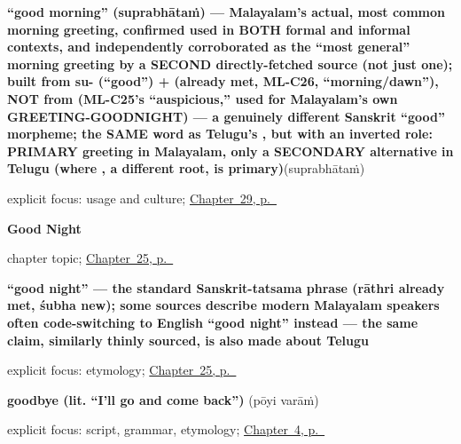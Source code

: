 \noindent\begin{minipage}[t]{\linewidth}
\raggedright
\textbf{\textquotedblleft{}good morning\textquotedblright{} (suprabhātaṁ) — Malayalam's actual, most common morning greeting, confirmed used in BOTH formal and informal contexts, and independently corroborated as the \textquotedblleft{}most general\textquotedblright{} morning greeting by a SECOND directly-fetched source (not just one); built from su- (\textquotedblleft{}good\textquotedblright{}) +  (already met, ML-C26, \textquotedblleft{}morning/dawn\textquotedblright{}), NOT from  (ML-C25's \textquotedblleft{}auspicious,\textquotedblright{} used for Malayalam's own GREETING-GOODNIGHT) — a genuinely different Sanskrit \textquotedblleft{}good\textquotedblright{} morpheme; the SAME word as Telugu's , but with an inverted role: PRIMARY greeting in Malayalam, only a SECONDARY alternative in Telugu (where , a different root, is primary)}\enspace\emph{}\enspace(suprabhātaṁ)\par
\footnotesize explicit focus: usage and culture; \hyperref[ch:ml-good-morning]{Chapter~29, p.~\pageref*{ch:ml-good-morning}}
\end{minipage}\par\smallskip

\noindent\begin{minipage}[t]{\linewidth}
\raggedright
\textbf{Good Night}\par
\footnotesize chapter topic; \hyperref[ch:ml-good-night]{Chapter~25, p.~\pageref*{ch:ml-good-night}}
\end{minipage}\par\smallskip

\noindent\begin{minipage}[t]{\linewidth}
\raggedright
\textbf{\textquotedblleft{}good night\textquotedblright{} — the standard Sanskrit-tatsama phrase (rāthri already met, śubha new); some sources describe modern Malayalam speakers often code-switching to English \textquotedblleft{}good night\textquotedblright{} instead — the same claim, similarly thinly sourced, is also made about Telugu}\enspace\emph{ }\par
\footnotesize explicit focus: etymology; \hyperref[ch:ml-good-night]{Chapter~25, p.~\pageref*{ch:ml-good-night}}
\end{minipage}\par\smallskip

\noindent\begin{minipage}[t]{\linewidth}
\raggedright
\textbf{goodbye (lit. \textquotedblleft{}I'll go and come back\textquotedblright{})}\enspace\emph{ }\enspace(pōyi varāṁ)\par
\footnotesize explicit focus: script, grammar, etymology; \hyperref[ch:farewells]{Chapter~4, p.~\pageref*{ch:farewells}}
\end{minipage}\par\smallskip

